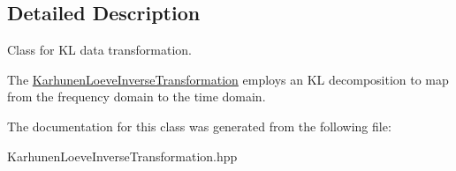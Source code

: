 \subsection{Detailed Description}
Class for KL data transformation. 

The \hyperlink{classPecos_1_1KarhunenLoeveInverseTransformation}{Karhunen\+Loeve\+Inverse\+Transformation} employs an KL decomposition to map from the frequency domain to the time domain. 

The documentation for this class was generated from the following file\+:\begin{DoxyCompactItemize}
\item 
Karhunen\+Loeve\+Inverse\+Transformation.\+hpp\end{DoxyCompactItemize}
